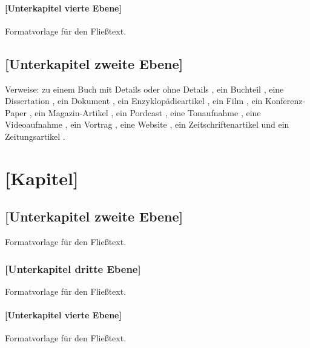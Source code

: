 \documentclass[a4paper,12pt,twoside]{scrreprt}
\begin{document}
\subsubsection{[Unterkapitel vierte Ebene]}
Formatvorlage für den Fließtext.



\section{[Unterkapitel zweite Ebene]}

Verweise: zu einem Buch mit Details \cite[vgl.][Kapitel 2]{bathe_finite-elemente-methoden_1990} oder ohne Details \cite{bathe_finite-elemente-methoden_1990}, ein Buchteil \cite{areger_problem-based_2007}, eine Dissertation \cite{sporn_interaktives_2000}, ein Dokument \cite{industriellenvereinigung_beste_2014}, ein Enzyklopädieartikel \cite{brockhaus_kreativitat_1872}, ein Film \cite{de_wilde_through_2008}, ein Konferenz-Paper \cite{weber_podcasts._2006}, ein Magazin-Artikel \cite{autornachname1_magazinartikeltitel_1995}, ein Pordcast \cite{paulus_horen_????}, eine Tonaufnahme \cite{horowitz_horowitz_2003}, eine Videoaufnahme \cite{fhvlearningsupport_was_2008}, ein Vortrag \cite{kohls_literaturverwaltung_2008}, eine Website \cite{wedekind_von_2008}, ein Zeitschriftenartikel \cite{hofer_wir_2008} und ein Zeitungsartikel \cite{schenkel_tsunami_2012}.


\chapter{[Kapitel]}

\section{[Unterkapitel zweite Ebene]}
Formatvorlage für den Fließtext.

\subsection{[Unterkapitel dritte Ebene]}
Formatvorlage für den Fließtext.

\subsubsection{[Unterkapitel vierte Ebene]}
Formatvorlage für den Fließtext.


\clearpage
{}
{}
\printbibliography
\end{document}
